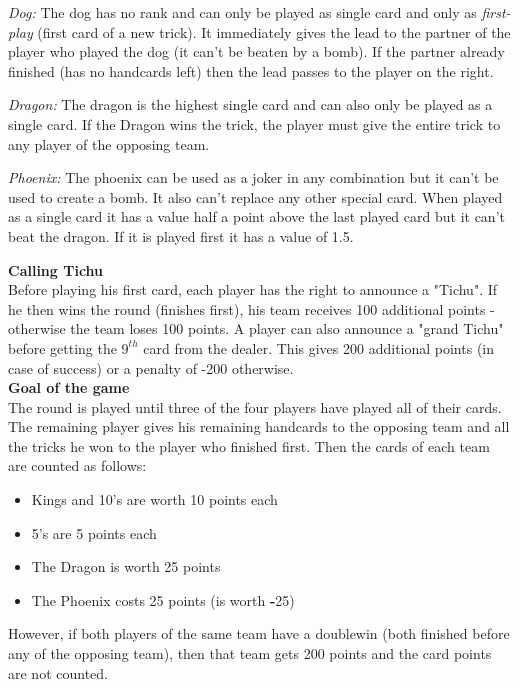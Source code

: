 \noindent \textit{Dog:} The dog has no rank and can only be played as single card and only as \textit{first-play} (first card of a new trick). It immediately gives the lead to the partner of the player who played the dog (it can't be beaten by a bomb). If the partner already finished (has no handcards left) then the lead passes to the player on the right.

\noindent \textit{Dragon:} The dragon is the highest single card and can also only be played as a single card. If the Dragon wins the trick, the player must give the entire trick to any player of the opposing team.

\noindent \textit{Phoenix:} The phoenix can be used as a joker in any combination but it can't be used to create a bomb. It also can't replace any other special card.
When played as a single card it has a value half a point above the last played card but it can't beat the dragon. If it is played first it has a value of 1.5.

\noindent\textbf{Calling Tichu}\\
Before playing his first card, each player has the right to announce a "Tichu". If he then wins the round (finishes first), his team receives 100 additional points - otherwise the team loses 100 points.
A player can also announce a "grand Tichu" before getting the $9^{th}$ card from the dealer. This gives 200 additional points (in case of success) or a penalty of -200 otherwise.\\

\noindent\textbf{Goal of the game}\\
The round is played until three of the four players have played all of their cards.
The remaining player gives his remaining handcards to the opposing team and all the tricks he won to the player who finished first.
Then the cards of each team are counted as follows:
\begin{itemize}
    \item Kings and 10's are worth 10 points each
    \item 5's are 5 points each
    \item The Dragon is worth 25 points
    \item The Phoenix costs 25 points (is worth \textbf{-}25)
\end{itemize}

However, if both players of the same team have a doublewin (both finished before any of the opposing team), then that team gets 200 points and the card points are not counted.


